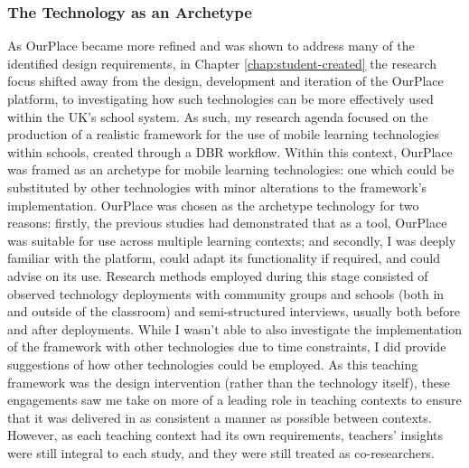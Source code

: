 \subsubsection{The Technology as an Archetype}
As OurPlace became more refined and was shown to address many of the identified design requirements, in Chapter \ref{chap:student-created} the research focus shifted away from the design, development and iteration of the OurPlace platform, to investigating how such technologies can be more effectively used within the UK's school system. As such, my research agenda focused on the production of a realistic framework for the use of mobile learning technologies within schools, created through a DBR workflow. Within this context, OurPlace was framed as an archetype for mobile learning technologies: one which could be substituted by other technologies with minor alterations to the framework's implementation. OurPlace was chosen as the archetype technology for two reasons: firstly, the previous studies had demonstrated that as a tool, OurPlace was suitable for use across multiple learning contexts; and secondly, I was deeply familiar with the platform, could adapt its functionality if required, and could advise on its use. Research methods employed during this stage consisted of observed technology deployments with community groups and schools (both in and outside of the classroom) and semi-structured interviews, usually both before and after deployments. While I wasn't able to also investigate the implementation of the framework with other technologies due to time constraints, I did provide suggestions of how other technologies could be employed. As this teaching framework was the design intervention (rather than the technology itself), these engagements saw me take on more of a leading role in teaching contexts to ensure that it was delivered in as consistent a manner as possible between contexts. However, as each teaching context had its own requirements, teachers' insights were still integral to each study, and they were still treated as co-researchers. 

